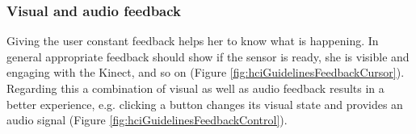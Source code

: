 \subsubsection{Visual and audio feedback}
Giving the user constant feedback helps her to know what is happening. In general appropriate feedback should show if the sensor is ready, she is visible and engaging with the Kinect, and so on (Figure \ref{fig:hciGuidelinesFeedbackCursor}). Regarding this a combination of visual as well as audio feedback results in a better experience, e.g. clicking a button changes its visual state and provides an audio signal (Figure \ref{fig:hciGuidelinesFeedbackControl}).

